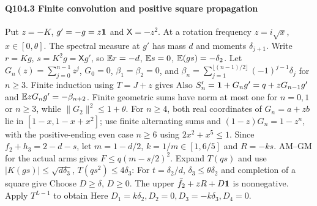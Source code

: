 \paragraph{Q104.3 Finite convolution and positive square propagation}\label{part:Q104.3}
Put $z=\allowbreak -K$, $g'=\allowbreak -g=\allowbreak z\mathbf1$ and $\mathsf X=\allowbreak -z^2$.
At a rotation frequency $z=\allowbreak i\sqrt x$, $x\in[0,\allowbreak \theta]$.
The spectral measure at $g'$ has mass $d$ and moments $\delta_{j+1}$.
Write $r=\allowbreak Kg$, $s=\allowbreak K^2g=\allowbreak \mathsf Xg'$, so
$\mathbb E r=\allowbreak -d$, $\mathbb E s=\allowbreak 0$, $\mathbb E(gs)=\allowbreak -\delta_2$.
Let $G_n(z)=\allowbreak \sum_{j=\allowbreak 0}^{n-1}z^j$, $G_0=\allowbreak 0$, $\beta_1=\allowbreak \beta_2=\allowbreak 0$, and
$\beta_n=\allowbreak \sum_{j=\allowbreak 1}^{\lfloor(n-1)/2\rfloor}(-1)^{j-1}\delta_j$ for $n\ge\allowbreak 3$.
Finite induction using $T=\allowbreak J+z$ gives
Also $S'_n=\allowbreak \mathbf1+G_ng'=\allowbreak q+zG_{n-1}g'$ and
$\mathbb E zG_ng'=\allowbreak -\beta_{n+2}$.
Finite geometric sums have norm at most one for $n=\allowbreak 0,\allowbreak 1$ or $n\ge\allowbreak 3$,
while $\|G_2\|^2\le\allowbreak 1+\theta$.
For $n\ge\allowbreak 4$, both real coordinates of $G_n=\allowbreak a+zb$ lie in
$[1-x,\allowbreak 1-x+x^2]$; use finite alternating sums and
$(1-z)G_n=\allowbreak 1-z^n$, with the positive-ending even case $n\ge\allowbreak 6$
using $2x^2+x^5\le\allowbreak 1$.
Since $f_2+h_3=\allowbreak 2-d-s$, let
$m=\allowbreak 1-d/2$, $k=\allowbreak 1/m\in[1,\allowbreak 6/5]$ and $R=\allowbreak -ks$.
AM--GM for the actual arms gives $F\le\allowbreak  q(m-s/2)^2$.
Expand $T(qs)$ and use $|K(gs)|\le\allowbreak \sqrt{d\delta_3}$,
$T(qs^2)\le\allowbreak 4\delta_3$:
For $t=\allowbreak \delta_2/d$, $\delta_3\le\allowbreak \theta\delta_2$ and completion of a square give
Choose $D\ge\allowbreak \delta$, $D\ge\allowbreak 0$. The upper $\bar f_2+zR+D\mathbf1$ is
nonnegative. Apply $T^{L-1}$ to obtain
Here $D_1=\allowbreak k\delta_2,\allowbreak D_2=\allowbreak 0,\allowbreak D_3=\allowbreak -k\delta_3,\allowbreak D_4=\allowbreak 0$.
